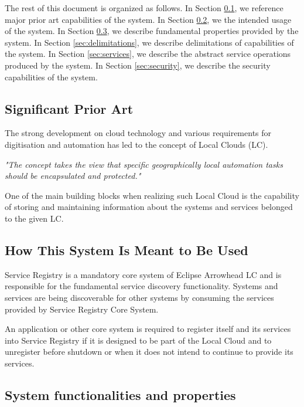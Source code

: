 \documentclass[a4paper]{arrowhead}
\begin{document}
The rest of this document is organized as follows.
In Section \ref{sec:prior_art}, we reference major prior art capabilities
of the system.
In Section \ref{sec:use}, we the intended usage of the system.
In Section \ref{sec:properties}, we describe fundamental properties
provided by the system.
In Section \ref{sec:delimitations}, we describe delimitations of capabilities
of the system.
In Section \ref{sec:services}, we describe the abstract service
operations produced by the system.
In Section \ref{sec:security}, we describe the security capabilities
of the system.

\newpage

\subsection{Significant Prior Art}
\label{sec:prior_art}

The strong development on cloud technology and various requirements for digitisation and automation has led to the concept of Local Clouds (LC).

\textit{"The concept takes the view that specific geographically local automation tasks should be encapsulated and protected."} \cite{jerker2017localclouds}

One of the main building blocks when realizing such Local Cloud is the capability of storing and maintaining information about the systems and services belonged to the given LC.

\subsection{How This System Is Meant to Be Used}
\label{sec:use}

Service Registry is a mandatory core system of Eclipse Arrowhead LC and is responsible for the fundamental service discovery functionality. Systems and services are being discoverable for other systems by consuming the services provided by Service Registry Core System.

An application or other core system is required to register itself and its services into Service Registry if it is designed to be part of the Local Cloud and to unregister before shutdown or when it does not intend to continue to provide its services.

\subsection{System functionalities and properties}
\label{sec:properties}
\end{document}
